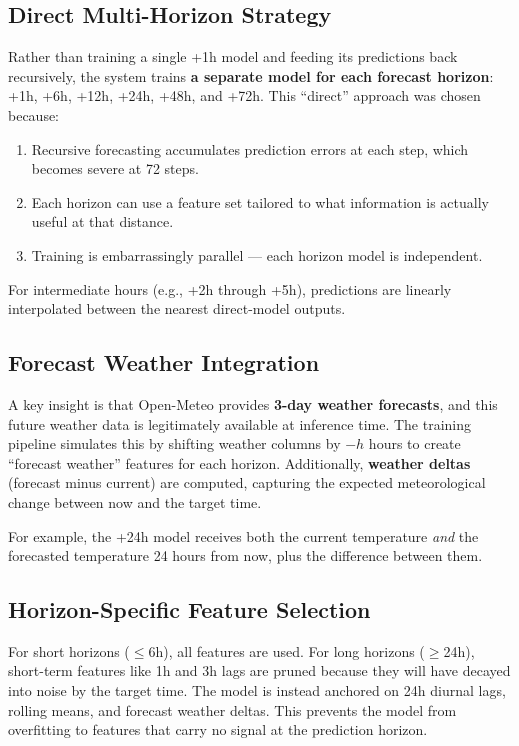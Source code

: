 \documentclass[12pt, a4paper]{article}
\begin{document}
\subsection{Direct Multi-Horizon Strategy}

Rather than training a single +1h model and feeding its predictions back recursively, the system trains \textbf{a separate model for each forecast horizon}: +1h, +6h, +12h, +24h, +48h, and +72h.  This ``direct'' approach was chosen because:

\begin{enumerate}
  \item Recursive forecasting accumulates prediction errors at each step, which becomes severe at 72 steps.
  \item Each horizon can use a feature set tailored to what information is actually useful at that distance.
  \item Training is embarrassingly parallel --- each horizon model is independent.
\end{enumerate}

For intermediate hours (e.g., +2h through +5h), predictions are linearly interpolated between the nearest direct-model outputs.

\subsection{Forecast Weather Integration}

A key insight is that Open-Meteo provides \textbf{3-day weather forecasts}, and this future weather data is legitimately available at inference time.  The training pipeline simulates this by shifting weather columns by $-h$ hours to create ``forecast weather'' features for each horizon.  Additionally, \textbf{weather deltas} (forecast minus current) are computed, capturing the expected meteorological change between now and the target time.

For example, the +24h model receives both the current temperature \emph{and} the forecasted temperature 24 hours from now, plus the difference between them.

\subsection{Horizon-Specific Feature Selection}

For short horizons ($\leq$6h), all features are used.  For long horizons ($\geq$24h), short-term features like 1h and 3h lags are pruned because they will have decayed into noise by the target time.  The model is instead anchored on 24h diurnal lags, rolling means, and forecast weather deltas.  This prevents the model from overfitting to features that carry no signal at the prediction horizon.
\end{document}
